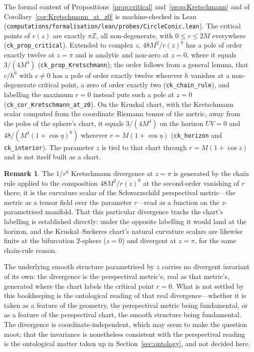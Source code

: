 \documentclass[11pt,a4paper]{article}
\theoremstyle{definition}
\newtheorem{remark}[theorem]{Remark}
\begin{document}
The formal content of Propositions~\ref{prop:critical} and~\ref{prop:Kretschmann} and of Corollary~\ref{cor:Kretschmann_at_z0} is machine-checked in Lean (\texttt{computations/formalisation/lean/probes/CircleConic.lean}). The critical points of $r(z)$ are exactly $\pi\mathbb{Z}$, all non-degenerate, with $0\le r\le 2M$ everywhere (\texttt{ck\_prop\_critical}). Extended to complex $z$, $48M^2/r(z)^6$ has a pole of order exactly twelve at $z=\pi$ and is analytic and non-zero at $z=0$, where it equals $3/(4M^4)$ (\texttt{ck\_prop\_Kretschmann}); the order follows from a general lemma, that $c/h^6$ with $c\neq0$ has a pole of order exactly twelve wherever $h$ vanishes at a non-degenerate critical point, a zero of order exactly two (\texttt{ck\_chain\_rule}), and labelling the maximum $r=0$ instead puts such a pole at $z=0$ (\texttt{ck\_cor\_Kretschmann\_at\_z0}). On the Kruskal chart, with the Kretschmann scalar computed from the coordinate Riemann tensor of the metric, away from the poles of the sphere's chart, it equals $3/(4M^4)$ on the horizon $UV=0$ and $48/(M^4(1+\cos\eta)^6)$ wherever $r=M(1+\cos\eta)$ (\texttt{ck\_horizon} and \texttt{ck\_interior}). The parameter $z$ is tied to that chart through $r=M(1+\cos z)$ and is not itself built as a chart.

\begin{remark}\label{rem:divergence_tracks_label}
The $1/r^6$ Kretschmann divergence at $z = \pi$ is generated by the chain rule applied to the composition $48M^2/r(z)^6$ at the second-order vanishing of $r$ there; it is the curvature scalar of the Schwarzschild perspectival metric---the metric as a tensor field over the parameter $r$---read as a function on the $z$-parametrised manifold. That this particular divergence tracks the chart's labelling is established directly: under the opposite labelling it would land at the horizon, and the Kruskal--Szekeres chart's natural curvature scalars are likewise finite at the bifurcation 2-sphere ($z = 0$) and divergent at $z = \pi$, for the same chain-rule reason.

The underlying smooth structure parametrised by $z$ carries no divergent invariant of its own: the divergence is the perspectival metric's, real as that metric's, generated where the chart labels the critical point $r=0$. What is not settled by this bookkeeping is the ontological reading of that real divergence---whether it is taken as a feature of the geometry, the perspectival metric being fundamental, or as a feature of the perspectival chart, the smooth structure being fundamental. The divergence is coordinate-independent, which may seem to make the question moot; that the invariance is nonetheless consistent with the perspectival reading is the ontological matter taken up in Section~\ref{sec:ontology}, and not decided here.
\end{remark}
\end{document}
